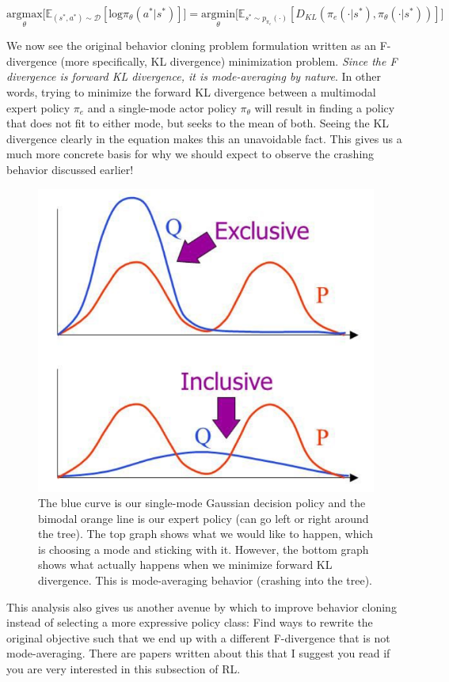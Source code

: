 \begin{flushleft}
    $$\underset{\theta}{\textrm{argmax}}\biggl[\mathbb{E}_{(s^*,a^*) \sim \mathcal{D}}[\mathrm{log}\pi_\theta(a^*|s^*)]\biggr] = \underset{\theta}{\textrm{argmin}}\biggl[\mathbb{E}_{s^* \sim p_{\pi_e}(\cdot)}[D_{KL}(\pi_e(\cdot|s^*),\pi_\theta(\cdot|s^*))]\biggr]$$

    We now see the original behavior cloning problem formulation written as an F-divergence (more specifically, KL divergence) minimization problem. \textit{Since the F divergence is forward KL divergence, it is mode-averaging by nature}. In other words, trying to minimize the forward KL divergence between a multimodal expert policy $\pi_e$ and a single-mode actor policy $\pi_\theta$ will result in finding a policy that does not fit to either mode, but seeks to the mean of both. Seeing the KL divergence clearly in the equation makes this an unavoidable fact. This gives us a much more concrete basis for why we should expect to observe the crashing behavior discussed earlier!

    \begin{figure}[H]
        \centering
        \includegraphics[width=0.7\linewidth]{rl/diffkl.png}
        \caption{The blue curve is our single-mode Gaussian decision policy and the bimodal orange line is our expert policy (can go left or right around the tree). The top graph shows what we would like to happen, which is choosing a mode and sticking with it. However, the bottom graph shows what actually happens when we minimize forward KL divergence. This is mode-averaging behavior (crashing into the tree).}
        \label{fig:diffkl}
    \end{figure}

    This analysis also gives us another avenue by which to improve behavior cloning instead of selecting a more expressive policy class: Find ways to rewrite the original objective such that we end up with a different F-divergence that is not mode-averaging. There are papers written about this that I suggest you read if you are very interested in this subsection of RL.
\end{flushleft}

